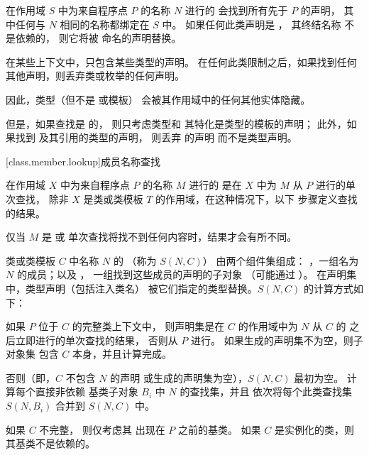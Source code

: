 \pnum
{}%
在作用域 $S$ 中为来自程序点 $P$ 的名称 $N$ 进行的 
会找到所有先于 $P$ 的声明，
其中任何与 $N$ 相同的名称都绑定在 $S$ 中。
如果任何此类声明是 ，
其终结名称
不是依赖的，
则它将被  命名的声明替换。

\pnum
在某些上下文中，只包含某些类型的声明。
在任何此类限制之后，如果找到任何其他声明，则丢弃类或枚举的任何声明。
\begin{note}
因此，类型（但不是  或模板）
会被其作用域中的任何其他实体隐藏。
\end{note}
%
但是，如果查找是  的，
则只考虑类型和
其特化是类型的模板的声明；
此外，如果找到  及其引用的类型的声明，
则丢弃  的声明
而不是类型声明。

[class.member.lookup]{成员名称查找}%
%
%

\pnum
{}%
在作用域 $X$ 中为来自程序点 $P$ 的名称 $M$ 进行的 
是在 $X$ 中为 $M$ 从 $P$ 进行的单次查找，
除非 $X$ 是类或类模板 $T$ 的作用域，在这种情况下，以下
步骤定义查找的结果。
\begin{note}
仅当 $M$ 是  或
单次查找将找不到任何内容时，结果才会有所不同。
\end{note}

\pnum
类或类模板 $C$ 中名称 $N$ 的 （称为 $S(N,C)$）
由两个组件集组成：
，一组名为 $N$ 的成员；以及
，
一组找到这些成员的声明的子对象
（可能通过 ）。
在声明集中，类型声明（包括注入类名）
被它们指定的类型替换。$S(N,C)$ 的计算方式如下：

\pnum
如果 $P$ 位于 $C$ 的完整类上下文中，
则声明集是在 $C$ 的作用域中为 $N$
从 $C$ 的  之后立即进行的单次查找的结果，
否则从 $P$ 进行。
如果生成的声明集不为空，则子对象集
包含 $C$ 本身，并且计算完成。

\pnum
否则（即，$C$ 不包含 $N$ 的声明
或生成的声明集为空），$S(N,C)$ 最初为空。
计算每个直接非依赖 基类子对象 $B_i$ 中 $N$ 的查找集，并且
依次将每个此类查找集 $S(N,B_i)$ 合并到 $S(N,C)$ 中。
\begin{note}
如果 $C$ 不完整，
则仅考虑其  出现在 $P$ 之前的基类。
如果 $C$ 是实例化的类，则其基类不是依赖的。
\end{note}


